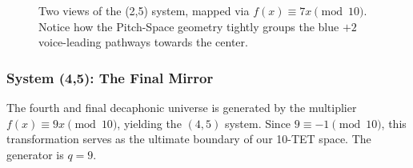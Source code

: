 \documentclass[11pt,letterpaper]{amsart}
\begin{document}
\begin{figure}[H]
\begin{minipage}{0.48\textwidth}
        \caption*{Pitch-Space Layout \\ (Geometric Rewiring)}
    \end{minipage}
    \caption{Two views of the (2,5) system, mapped via $f(x) \equiv 7x \pmod{10}$. Notice how the Pitch-Space geometry tightly groups the blue $+2$ voice-leading pathways towards the center.}
\end{figure}

\subsubsection{System (4,5): The Final Mirror}

The fourth and final decaphonic universe is generated by the multiplier $f(x) \equiv 9x \pmod{10}$, yielding the $(4,5)$ system. Since $9 \equiv -1 \pmod{10}$, this transformation serves as the ultimate boundary of our 10-TET space. The generator is $q=9$.
\end{document}
